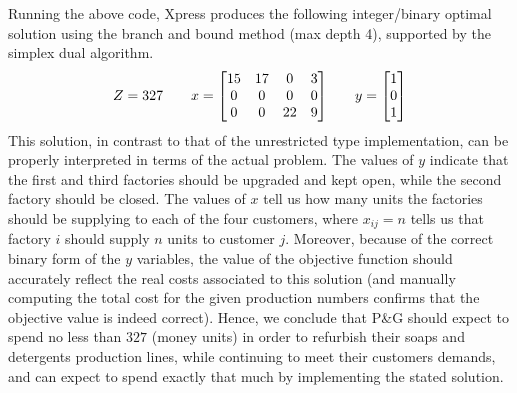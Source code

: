 \documentclass[12pt]{article}
\theoremstyle{definition}
\begin{document}
Running the above code, Xpress produces the following integer/binary optimal solution using the branch and bound method (max depth 4), supported by the simplex dual algorithm.
\[
    Z = 327
    \qquad
    x = \mqty[
        15 & 17 & 0 & 3 \\
        0 & 0 & 0 & 0 \\
        0 & 0 & 22 & 9
    ]
    \qquad
    y = \mqty[1 \\ 0 \\ 1]
\]
This solution, in contrast to that of the unrestricted type implementation, can be properly interpreted in terms of the actual problem. The values of $y$ indicate that the first and third factories should be upgraded and kept open, while the second factory should be closed. The values of $x$ tell us how many units the factories should be supplying to each of the four customers, where $x_{ij} = n$ tells us that factory $i$ should supply $n$ units to customer $j$. Moreover, because of the correct binary form of the $y$ variables, the value of the objective function should accurately reflect the real costs associated to this solution (and manually computing the total cost for the given production numbers confirms that the objective value is indeed correct). Hence, we conclude that P\&G should expect to spend no less than $327$ (money units) in order to refurbish their soaps and detergents production lines, while continuing to meet their customers demands, and can expect to spend exactly that much by implementing the stated solution.
\end{document}
